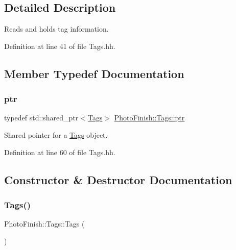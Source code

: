 \subsection{Detailed Description}
Reads and holds tag information. 

Definition at line 41 of file Tags.\+hh.



\subsection{Member Typedef Documentation}
\mbox{\label{class_photo_finish_1_1_tags_a3f9b01990d51bb4f4e5086182a8ddcf9}} 
\subsubsection{\texorpdfstring{ptr}{ptr}}
{\footnotesize\ttfamily typedef std\+::shared\+\_\+ptr$<$\hyperlink{class_photo_finish_1_1_tags}{Tags}$>$ \hyperlink{class_photo_finish_1_1_tags_a3f9b01990d51bb4f4e5086182a8ddcf9}{Photo\+Finish\+::\+Tags\+::ptr}}



Shared pointer for a \hyperlink{class_photo_finish_1_1_tags}{Tags} object. 



Definition at line 60 of file Tags.\+hh.



\subsection{Constructor \& Destructor Documentation}
\mbox{\label{class_photo_finish_1_1_tags_a3f2c0bcd42972aa25fed0e04d89493f1}} 
\subsubsection{\texorpdfstring{Tags()}{Tags()}\hspace{0.1cm}{\footnotesize\ttfamily [1/3]}}
{\footnotesize\ttfamily Photo\+Finish\+::\+Tags\+::\+Tags (\begin{DoxyParamCaption}{ }\end{DoxyParamCaption})}



